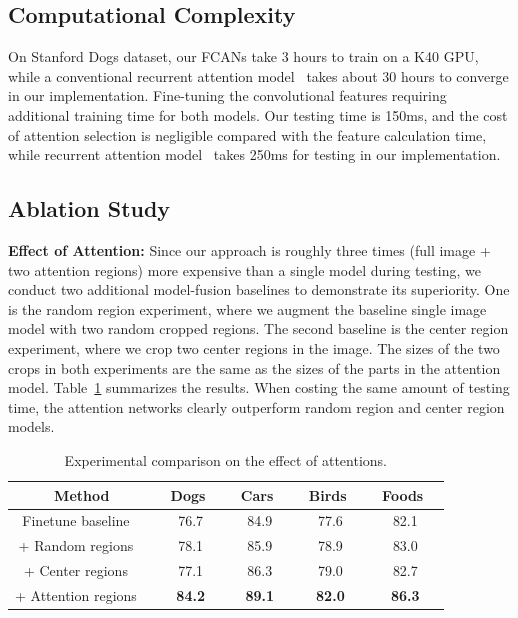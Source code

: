 \documentclass[10pt,twocolumn,letterpaper]{article}
\begin{document}
\subsection{Computational Complexity}

On Stanford Dogs dataset, our FCANs take 3 hours to train on a K40 GPU, while a conventional recurrent attention model~\cite{bd3} takes about 30 hours to converge in our implementation. Fine-tuning the convolutional features requiring additional training time for both models. Our testing time is 150ms, and the cost of attention selection is negligible compared with the feature calculation time, while recurrent attention model~\cite{bd3} takes 250ms for testing in our implementation.

\subsection{Ablation Study}

\textbf{Effect of Attention:}
Since our approach is roughly three times (full image + two attention regions) more expensive than a single model during testing, we conduct two additional model-fusion baselines to demonstrate its superiority.
One is the random region experiment, where we augment the baseline single image model with two random cropped regions.
The second baseline is the center region experiment, where we crop two center regions in the image.
The sizes of the two crops in both experiments are the same as the sizes of the parts in the attention model.
Table~\ref{tab:effect_of_attention} summarizes the results.
When costing the same amount of testing time, the attention networks clearly outperform random region and center region models.

\begin{table}[t]
\centering
\begin{tabular}{c||c|c|c|c}
\hline
Method & \ Dogs \ & \ Cars \ & \ Birds \ & \ Foods \ \\ \hline\hline
Finetune baseline \ & 76.7 & 84.9 & 77.6 & 82.1\\
+ Random regions \ & 78.1 & 85.9 & 78.9 & 83.0 \\
+ Center regions \ & 77.1 & 86.3 & 79.0 & 82.7 \\
+ Attention regions \ & \bf{84.2} & \bf{89.1} & \bf{82.0} & \bf{86.3} \\ \hline
\end{tabular}
\caption{Experimental comparison on the effect of attentions.}
\label{tab:effect_of_attention}
\end{table}
\end{document}
